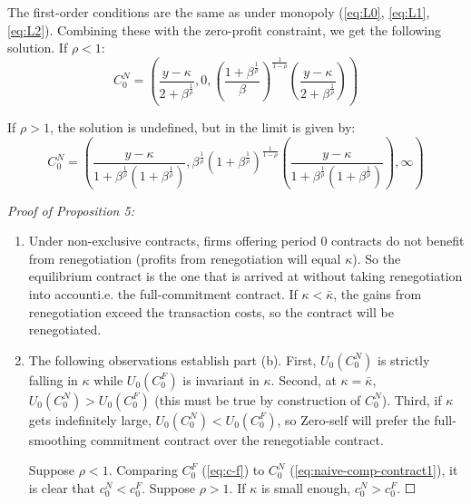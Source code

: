 \documentclass[11pt,english]{article}
\theoremstyle{plain}
\theoremstyle{definition}
\begin{document}
The first-order conditions are the same as under monopoly (\ref{eq:L0},
\ref{eq:L1}, \ref{eq:L2}). Combining these with the zero-profit
constraint, we get the following solution. If $\rho<1$: 
\begin{equation}
C_{0}^{N}=\left(\frac{y-\kappa}{2+\beta^{\frac{1}{\rho}}},0,\left(\frac{1+\beta^{\frac{1}{\rho}}}{\beta}\right)^{\frac{1}{1-\rho}}\left(\frac{y-\kappa}{2+\beta^{\frac{1}{\rho}}}\right)\right)\label{eq:naive-comp-contract1}
\end{equation}

If $\rho>1$, the solution is undefined, but in the limit is given
by: 
\begin{equation}
C_{0}^{N}=\left(\frac{y-\kappa}{1+\beta^{\frac{1}{\rho}}\left(1+\beta^{\frac{1}{\rho}}\right)},\beta^{\frac{1}{\rho}}\left(1+\beta^{\frac{1}{\rho}}\right)^{\frac{1}{1-\rho}}\left(\frac{y-\kappa}{1+\beta^{\frac{1}{\rho}}\left(1+\beta^{\frac{1}{\rho}}\right)}\right),\infty\right)\label{eq:naive-comp-contract2}
\end{equation}

\emph{Proof of Proposition 5:}
\begin{enumerate} [label=\alph*)]

\item Under non-exclusive contracts, firms offering period 0 contracts
do not benefit from renegotiation (profits from renegotiation will
equal $\kappa$). So the equilibrium contract is the one that is arrived
at without taking renegotiation into account\textendash i.e. the full-commitment
contract. If $\kappa<\bar{\kappa}$, the gains from renegotiation
exceed the transaction costs, so the contract will be renegotiated.

\item The following observations establish part (b). First, $U_{0}\left(C_{0}^{N}\right)$
is strictly falling in $\kappa$ while $U_{0}\left(C_{0}^{F}\right)$
is invariant in $\kappa$. Second, at $\kappa=\bar{\kappa}$, $U_{0}\left(C_{0}^{N}\right)>U_{0}\left(C_{0}^{F}\right)$
(this must be true by construction of $C_{0}^{N}$). Third, if $\kappa$
gets indefinitely large, $U_{0}\left(C_{0}^{N}\right)<U_{0}\left(C_{0}^{F}\right)$,
so Zero-self will prefer the full-smoothing commitment contract over
the renegotiable contract.

Suppose $\rho<1$. Comparing $C_{0}^{F}$ (\ref{eq:c-f}) to $C_{0}^{N}$
(\ref{eq:naive-comp-contract1}), it is clear that $c_{0}^{N}<c_{0}^{F}$.
Suppose $\rho>1$. If $\kappa$ is small enough, $c_{0}^{N}>c_{0}^{F}$.
$\Square$
\end{enumerate}
\end{document}
